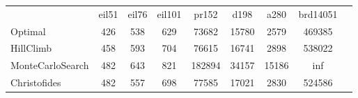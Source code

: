 \begin{tabular}[ht]{|l||c|c|c|c|c|c|c|H}
 & eil51 & eil76 & eil101 & pr152 & d198 & a280 & brd14051 & \\  
Optimal &426 & 538 & 629 & 73682 & 15780 & 2579 & 469385 & \\ 
HillClimb &458 & 593 & 704 & 76615 & 16741 & 2898 & 538022 & \\ 
MonteCarloSearch &482 & 643 & 821 & 182894 & 34157 & 15186 & inf & \\ 
Christofides &482 & 557 & 698 & 77585 & 17021 & 2830 & 524586 & \\ 
\end{tabular}
